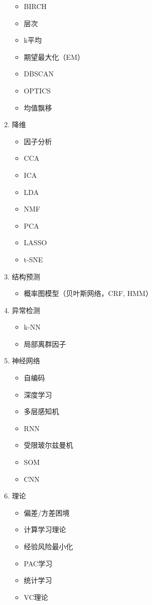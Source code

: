 \documentclass[11pt]{article}
\begin{document}
\begin{enumerate}
\begin{itemize}
\item BIRCH
\item 层次
\item k平均
\item 期望最大化（EM）
\item DBSCAN
\item OPTICS
\item 均值飘移
\end{itemize}
\item 降维
\label{sec:orgheadline105}
\begin{itemize}
\item 因子分析
\item CCA
\item ICA
\item LDA
\item NMF
\item PCA
\item LASSO
\item t-SNE
\end{itemize}
\item 结构预测
\label{sec:orgheadline106}

\begin{itemize}
\item 概率图模型（贝叶斯网络，CRF, HMM）
\end{itemize}
\item 异常检测
\label{sec:orgheadline107}
\begin{itemize}
\item k-NN
\item 局部离群因子
\end{itemize}
\item 神经网络
\label{sec:orgheadline108}

\begin{itemize}
\item 自编码
\item 深度学习
\item 多层感知机
\item RNN
\item 受限玻尔兹曼机
\item SOM
\item CNN
\end{itemize}
\item 理论
\label{sec:orgheadline109}

\begin{itemize}
\item 偏差/方差困境
\item 计算学习理论
\item 经验风险最小化
\item PAC学习
\item 统计学习
\item VC理论
\end{itemize}
\end{enumerate}
\end{document}
